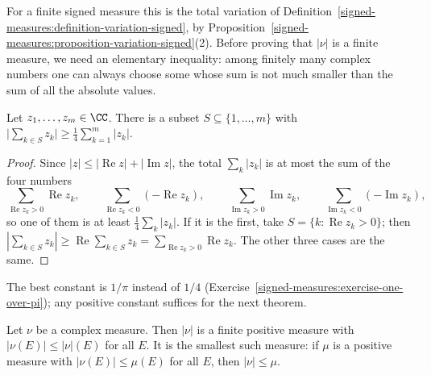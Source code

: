 For a finite signed measure this is the total variation of Definition~\ref{signed-measures:definition-variation-signed}, by Proposition~\ref{signed-measures:proposition-variation-signed}(2). Before
proving that $|\nu|$ is a finite measure, we need an elementary inequality: among finitely many complex numbers one can always choose some whose sum is not much smaller than the sum of all the
absolute values.

\begin{lemma}\label{signed-measures:lemma-quarter}
Let $z_1, \ldots, z_m \in \CC$. There is a subset $S \subseteq \{1, \ldots, m\}$ with $\bigl|\sum_{k \in S}z_k\bigr| \geq \frac14\sum_{k=1}^m|z_k|$.
\end{lemma}

\begin{proof}
Since $|z| \leq |\operatorname{Re}z| + |\operatorname{Im}z|$, the total $\sum_k|z_k|$ is at most the sum of the four numbers
\[
\sum_{\operatorname{Re}z_k > 0}\operatorname{Re}z_k, \qquad \sum_{\operatorname{Re}z_k < 0}(-\operatorname{Re}z_k), \qquad \sum_{\operatorname{Im}z_k > 0}\operatorname{Im}z_k, \qquad
\sum_{\operatorname{Im}z_k < 0}(-\operatorname{Im}z_k),
\]
so one of them is at least $\frac14\sum_k|z_k|$. If it is the first, take $S = \{k : \operatorname{Re}z_k > 0\}$; then
$|\sum_{k \in S}z_k| \geq \operatorname{Re}\sum_{k \in S}z_k = \sum_{\operatorname{Re}z_k > 0}\operatorname{Re}z_k$. The other three cases are the same.
\end{proof}

The best constant is $1/\pi$ instead of $1/4$ (Exercise~\ref{signed-measures:exercise-one-over-pi}); any positive constant suffices for the next theorem.

\begin{theorem}\label{signed-measures:theorem-total-variation}
Let $\nu$ be a complex measure. Then $|\nu|$ is a finite positive measure with $|\nu(E)| \leq |\nu|(E)$ for all $E$. It is the smallest such measure: if $\mu$ is a positive measure with
$|\nu(E)| \leq \mu(E)$ for all $E$, then $|\nu| \leq \mu$.
\end{theorem}

